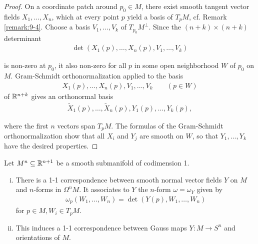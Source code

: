 \begin{proof}
  On a coordinate patch around $p_0\in M$, there exist smooth tangent vector
fields $X_1, \ldots, X_n$, which at every point $p$ yield a basis of $T_pM$, cf. 
Remark \ref{remark:9-4}. Choose a basis $V_1, \ldots, V_k$ of $T_{p_0}M^\perp$. Since 
the $(n+k)\times (n+k)$ determinant 
\begin{align*}
  \det(X_1(p), \ldots, X_n(p), V_1, \ldots, V_k) 
\end{align*}

is non-zero at $p_0$, it also non-zero for all $p$ in some open neighborhood $W$ of $p_0$
on $M$. Gram-Schmidt orthonormalization applied to the basis
\begin{align*}
  X_1(p), \ldots, X_n(p), V_1, \ldots, V_k\qquad (p\in W)
\end{align*}
of ${\mathbb{R}}^{n+k}$ gives an orthonormal basis 
\begin{align*}
  \tilde{X}_1(p), \ldots,\tilde{X}_n(p), Y_1(p), \ldots, Y_k(p),
\end{align*}

where the first $n$ vectors span $T_pM$. The formulas of the Gram-Schmidt orthonormalization 
show that all $X_i$ and $Y_j$ are smooth on $W$, so that $Y_1, \ldots, Y_k$ have the desired 
properties.
\end{proof}

\begin{proposition}\label{prop:9-22}
  Let $M^n\subseteq {\ensuremath{\mathbb{R}}}^{n+1}$ be a smooth submanifold of codimension 1.
  \begin{enumerate}[(i)]
    \item There is a 1-1 correspondence between smooth normal vector fields $Y$ on
      $M$ and $n$-forms in $\Omega^n{M}$. It associates to $Y$ the $n$-form $\omega=\omega_Y$ 
      given by
      \begin{align*}
        \omega_p(W_1, \ldots, W_n) = \det (Y(p), W_1, \ldots, W_n)
      \end{align*}
      for $p\in M, W_i\in T_pM$.
    \item This induces a 1-1 correspondence between Gauss maps $Y\colon M\to S^n$ and
      orientations of $M$.
  \end{enumerate}
\end{proposition}

